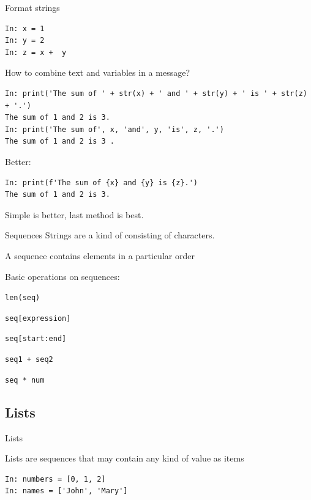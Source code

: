 \documentclass[aspectratio=169,usenames,dvipsnames]{beamer}
\begin{document}
\begin{frame}[fragile]{Format strings}
\begin{lstlisting}
In: x = 1
In: y = 2
In: z = x +  y
\end{lstlisting}
How to combine text and variables in a message?
\begin{lstlisting}
In: print('The sum of ' + str(x) + ' and ' + str(y) + ' is ' + str(z) + '.')
The sum of 1 and 2 is 3.
In: print('The sum of', x, 'and', y, 'is', z, '.')
The sum of 1 and 2 is 3 .
\end{lstlisting}

\pause
Better:
\begin{lstlisting}
In: print(f'The sum of {x} and {y} is {z}.')
The sum of 1 and 2 is 3.
\end{lstlisting}

Simple is better, last method is best.
\end{frame}

\begin{frame}{Sequences}
    Strings are a kind of 
    consisting of characters.

    \vspace{1em}
    A sequence contains elements in a particular order

    \vspace{1em}
    Basic operations on sequences:
    \begin{description}[concatenation:]
        \item[getting length:]     \lstinline{len(seq)}
        \item[indexing:]           \lstinline{seq[expression]}
        \item[slicing:]            \lstinline{seq[start:end]}
        \item[concatenation:]      \lstinline{seq1 + seq2}
        \item[repetition:]         \lstinline{seq * num}
    \end{description}
\end{frame}


\subsection{Lists}
\frame{\tableofcontents[currentsubsection]}

\begin{frame}[fragile]{Lists}
    \begin{definition}
    Lists are sequences that may contain any kind of value as items
    \end{definition}
\begin{lstlisting} 
In: numbers = [0, 1, 2]
In: names = ['John', 'Mary']
\end{lstlisting} 
\end{frame}
\end{document}
